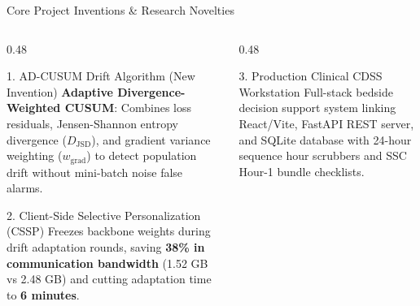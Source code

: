 \documentclass[aspectratio=169, 11pt]{beamer}
\begin{document}
\begin{frame}{Core Project Inventions \& Research Novelties}
    \begin{columns}[t]
        \begin{column}{0.48\textwidth}
            \begin{alertblock}{1. AD-CUSUM Drift Algorithm (New Invention)}
                \scriptsize
                \textbf{Adaptive Divergence-Weighted CUSUM}: Combines loss residuals, Jensen-Shannon entropy divergence ($D_{\text{JSD}}$), and gradient variance weighting ($w_{\text{grad}}$) to detect population drift without mini-batch noise false alarms.
            \end{alertblock}
            
            \begin{alertblock}{2. Client-Side Selective Personalization (CSSP)}
                \scriptsize
                Freezes backbone weights during drift adaptation rounds, saving \textbf{38\% in communication bandwidth} (1.52 GB vs 2.48 GB) and cutting adaptation time to \textbf{6 minutes}.
            \end{alertblock}
        \end{column}
        
        \begin{column}{0.48\textwidth}
            \begin{alertblock}{3. Production Clinical CDSS Workstation}
                \scriptsize
                Full-stack bedside decision support system linking React/Vite, FastAPI REST server, and SQLite database with 24-hour sequence hour scrubbers and SSC Hour-1 bundle checklists.
            \end{alertblock}
        \end{column}
    \end{columns}
\end{frame}
\end{document}
